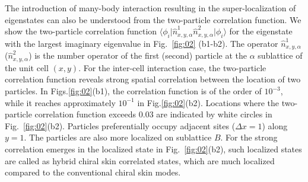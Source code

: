 \documentclass[longbibliography, aps, prx, amsmath, amssymb, amsfonts, twocolumn,superscriptaddress, footinbib]{revtex4-1}
\begin{document}
	
	The introduction of many-body interaction resulting in the super-localization of eigenstates can also be understood from the two-particle correlation function. 
	We show the two-particle correlation function $\langle \phi_i \vert \hat{n}^1_{x,y,\alpha} \hat{n}^2_{x,y,\alpha} \vert \phi_i \rangle$ for the eigenstate with the largest imaginary eigenvalue in Fig.~\ref{fig:02} (b1-b2). The operator $\hat{n}^1_{x,y,\alpha}$ ($\hat{n}^2_{x,y,\alpha}$) is the number operator of the first (second) particle at the $\alpha$ sublattice of the unit cell $(x,y)$.
	For the inter-cell interaction case, the two-particle correlation function reveals strong spatial correlation between the location of two particles. 
	In Figs.\ref{fig:02}(b1), the correlation function is of the order of $10^{-3}$, while it reaches approximately $10^{-1}$ in Fig.\ref{fig:02}(b2). Locations where the two-particle correlation function exceeds $0.03$ are indicated by white circles in Fig.~\ref{fig:02}(b2).
	Particles preferentially occupy adjacent sites ($\Delta x =1$) along $y=1$.  The particles are also more localized on sublattice $B$. 
	For the strong correlation emerges in the localized state in Fig.~\ref{fig:02}(b2), such localized states are called as hybrid chiral skin correlated states, which are much localized compared to the conventional chiral skin modes.
\end{document}

